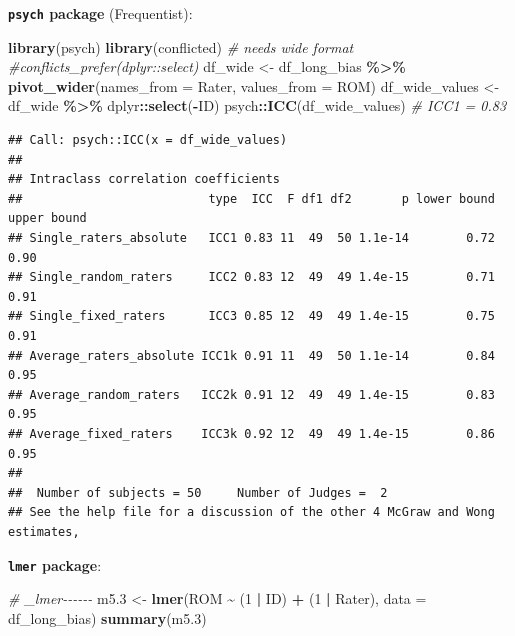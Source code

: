 \documentclass[
]{book}
\newenvironment{Shaded}{\begin{snugshade}}{\end{snugshade}}
\newcommand{\AttributeTok}[1]{\textcolor[rgb]{0.13,0.29,0.53}{#1}}
\newcommand{\CommentTok}[1]{\textcolor[rgb]{0.56,0.35,0.01}{\textit{#1}}}
\newcommand{\DecValTok}[1]{\textcolor[rgb]{0.00,0.00,0.81}{#1}}
\newcommand{\FloatTok}[1]{\textcolor[rgb]{0.00,0.00,0.81}{#1}}
\newcommand{\FunctionTok}[1]{\textcolor[rgb]{0.13,0.29,0.53}{\textbf{#1}}}
\newcommand{\NormalTok}[1]{#1}
\newcommand{\OtherTok}[1]{\textcolor[rgb]{0.56,0.35,0.01}{#1}}
\newcommand{\SpecialCharTok}[1]{\textcolor[rgb]{0.81,0.36,0.00}{\textbf{#1}}}
\begin{document}
\textbf{\texttt{psych} package} (Frequentist):

\begin{Shaded}
\begin{Highlighting}[]
\FunctionTok{library}\NormalTok{(psych)}
\FunctionTok{library}\NormalTok{(conflicted)}
\CommentTok{\# needs wide format}
\CommentTok{\#conflicts\_prefer(dplyr::select)}
\NormalTok{df\_wide }\OtherTok{\textless{}{-}}\NormalTok{ df\_long\_bias }\SpecialCharTok{\%\textgreater{}\%}
  \FunctionTok{pivot\_wider}\NormalTok{(}\AttributeTok{names\_from =}\NormalTok{ Rater, }\AttributeTok{values\_from =}\NormalTok{ ROM)}
\NormalTok{df\_wide\_values }\OtherTok{\textless{}{-}}\NormalTok{ df\_wide }\SpecialCharTok{\%\textgreater{}\%}\NormalTok{ dplyr}\SpecialCharTok{::}\FunctionTok{select}\NormalTok{(}\SpecialCharTok{{-}}\NormalTok{ID)}
\NormalTok{psych}\SpecialCharTok{::}\FunctionTok{ICC}\NormalTok{(df\_wide\_values) }\CommentTok{\# ICC1 = 0.83}
\end{Highlighting}
\end{Shaded}

\begin{verbatim}
## Call: psych::ICC(x = df_wide_values)
## 
## Intraclass correlation coefficients 
##                          type  ICC  F df1 df2       p lower bound upper bound
## Single_raters_absolute   ICC1 0.83 11  49  50 1.1e-14        0.72        0.90
## Single_random_raters     ICC2 0.83 12  49  49 1.4e-15        0.71        0.91
## Single_fixed_raters      ICC3 0.85 12  49  49 1.4e-15        0.75        0.91
## Average_raters_absolute ICC1k 0.91 11  49  50 1.1e-14        0.84        0.95
## Average_random_raters   ICC2k 0.91 12  49  49 1.4e-15        0.83        0.95
## Average_fixed_raters    ICC3k 0.92 12  49  49 1.4e-15        0.86        0.95
## 
##  Number of subjects = 50     Number of Judges =  2
## See the help file for a discussion of the other 4 McGraw and Wong estimates,
\end{verbatim}

\textbf{\texttt{lmer} package}:

\begin{Shaded}
\begin{Highlighting}[]
\CommentTok{\# \_lmer{-}{-}{-}{-}{-}{-}}
\NormalTok{m5}\FloatTok{.3} \OtherTok{\textless{}{-}} \FunctionTok{lmer}\NormalTok{(ROM }\SpecialCharTok{\textasciitilde{}}\NormalTok{ (}\DecValTok{1} \SpecialCharTok{|}\NormalTok{ ID) }\SpecialCharTok{+}\NormalTok{ (}\DecValTok{1} \SpecialCharTok{|}\NormalTok{ Rater), }\AttributeTok{data =}\NormalTok{ df\_long\_bias)}
\FunctionTok{summary}\NormalTok{(m5}\FloatTok{.3}\NormalTok{)}
\end{Highlighting}
\end{Shaded}
\end{document}
